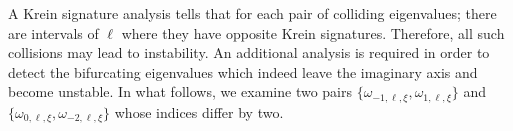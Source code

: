 \documentclass[12pt]{amsart}    %
\renewcommand{\leq}{\leqslant}
\renewcommand{\k}{\kappa}
\newcommand{\N}{\mathbb{N}}
\newcommand{\oned}{(1,\downarrow)}
\newcommand{\minu}{(-1,\uparrow)}
\newtheorem{lemma}[theorem]{Lemma}
\numberwithin{equation}{section}
\begin{document}
A Krein signature analysis tells that for each pair of colliding eigenvalues; there are intervals of $\ell$ where they have opposite Krein signatures. Therefore, all such collisions may lead to instability. 
 An additional analysis is required in order to detect the bifurcating eigenvalues which indeed leave the imaginary axis and become unstable. In what follows, we examine two pairs $\{\omega_{-1,\ell,\xi},\omega_{1,\ell,\xi}\}$ and $\{\omega_{0,\ell,\xi},\omega_{-2,\ell,\xi}\}$ whose indices differ by two. 
\end{document}
